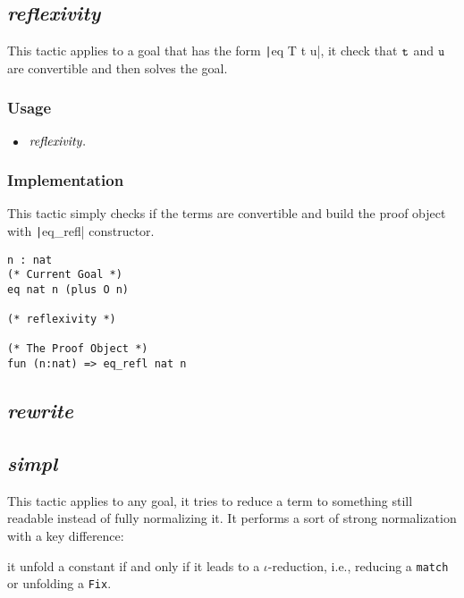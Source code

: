 \subsection{\it reflexivity}
This tactic applies to a goal that has the form \texttt|eq T t u|, it check that $\tt t$ and $\tt u$ 
are convertible and then solves the goal.

\subsubsection*{Usage}
\begin{itemize}
\item ${\it reflexivity}.$
\end{itemize}

\subsubsection*{Implementation}
This tactic simply checks if the terms are convertible and build the proof object with \texttt|eq_refl| constructor.

\begin{center}
\begin{minipage}{0.7\textwidth}
\begin{verbatim}
n : nat
(* Current Goal *)  
eq nat n (plus O n)   

(* reflexivity *)

(* The Proof Object *)
fun (n:nat) => eq_refl nat n
\end{verbatim}
\end{minipage}
\end{center}

\subsection{\it rewrite}

\subsection{\it simpl}
This tactic applies to any goal, it tries to reduce a term to something still readable instead of fully normalizing it. 
It performs a sort of strong normalization with a key difference:
\begin{center}
\begin{minipage}{0.7\textwidth}
it unfold a constant if and only if it leads to a $\iota$-reduction, i.e., reducing a {\tt match} or unfolding a {\tt Fix}.
\end{minipage}
\end{center}


